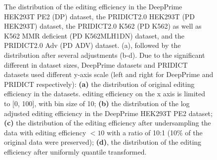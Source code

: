 \begin{figure}
    \centering
    \label{fig:imbalanced}
    \caption[Target Distribution Imbalance]{The distribution of the editing efficiency in the DeepPrime HEK293T PE2 (DP) dataset, the PRIDICT2.0 HEK293T (PD HEK293T) dataset, the PRIDICT2.0 K562 (PD K562) as well as K562 MMR deficient (PD K562MLH1DN) dataset, and the PRIDICT2.0 Adv (PD ADV) dataset. (a), followed by the distribution after several adjustments (b-d). Due to the significant different in dataset sizes, DeepPrime datasets and PRIDICT datasets used different y-axis scale (left and right for DeepPrime and PRIDICT respectively): 
    \textbf{(a)} the distribution of original editing efficiency in the datasets. editing efficiency on the x axis is limited to [0, 100], with bin size of 10; \textbf{(b)} the distribution of the log adjusted editing efficiency in the DeepPrime HEK293T PE2 dataset; \textbf{(c)} the distribution of the editing efficiency after undersampling the data with editing efficiency $<10$ with a ratio of 10:1 (10\% of the original data were preserved); \textbf{(d)}, the distribution of the editing efficiency after uniformly quantile transformed.}
\end{figure}


